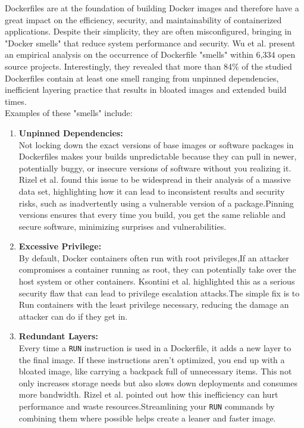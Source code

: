 Dockerfiles are at the foundation of building Docker images and therefore have a great impact on the efficiency, security, and maintainability of containerized applications. Despite their simplicity, they are often misconfigured, bringing in "Docker smells" that reduce system performance and security. Wu et al. present an empirical analysis on the occurrence of Dockerfile "smells" within 6,334 open source projects. Interestingly, they revealed that more than 84\% of the studied Dockerfiles contain at least one smell ranging from unpinned dependencies, inefficient layering practice that results in bloated images and extended build times.\cite{CharacterizingtheOccurrenceofDockerfile}\\Examples of these "smells" include:
\begin{enumerate}
    \item \textbf{Unpinned Dependencies:}\\Not locking down the exact versions of base images or software packages in Dockerfiles makes your builds unpredictable because they can pull in newer, potentially buggy, or insecure versions of software without you realizing it. Rizel et al. found this issue to be widespread in their analysis of a massive data set, highlighting how it can lead to inconsistent results and security risks, such as inadvertently using a vulnerable version of a package\cite{CharacterizingtheOccurrenceofDockerfile}.Pinning versions ensures that every time you build, you get the same reliable and secure software, minimizing surprises and vulnerabilities.
    \item \textbf{Excessive Privilege:}\\By default, Docker containers often run with root privileges,If an attacker compromises a container running as root, they can potentially take over the host system or other containers. Ksontini et al. highlighted this as a serious security flaw that can lead to privilege escalation attacks\cite{ksontini2021refactorings}.The simple fix is to Run containers with the least privilege necessary, reducing the damage an attacker can do if they get in.
    \item \textbf{Redundant Layers:}\\Every time a \verb|RUN|  instruction is used in a Dockerfile, it adds a new layer to the final image. If these instructions aren’t optimized, you end up with a bloated image, like carrying a backpack full of unnecessary items. This not only increases storage needs but also slows down deployments and consumes more bandwidth. Rizel et al. pointed out how this inefficiency can hurt performance and waste resources\cite{CharacterizingtheOccurrenceofDockerfile}.Streamlining your \verb|RUN| commands by combining them where possible helps create a leaner and faster image.
\end{enumerate}

